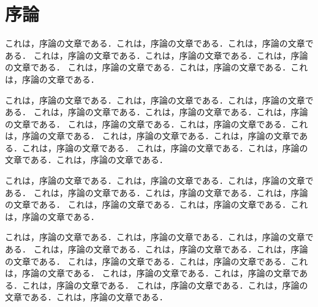 \chapter{序論}

これは，序論の文章である．これは，序論の文章である．これは，序論の文章である．
これは，序論の文章である．これは，序論の文章である．これは，序論の文章である．
これは，序論の文章である．これは，序論の文章である．これは，序論の文章である．

これは，序論の文章である．これは，序論の文章である．これは，序論の文章である．
これは，序論の文章である．これは，序論の文章である．これは，序論の文章である．
これは，序論の文章である．これは，序論の文章である．これは，序論の文章である．
これは，序論の文章である．これは，序論の文章である．これは，序論の文章である．
これは，序論の文章である．これは，序論の文章である．これは，序論の文章である．

これは，序論の文章である．これは，序論の文章である．これは，序論の文章である．
これは，序論の文章である．これは，序論の文章である．これは，序論の文章である．
これは，序論の文章である．これは，序論の文章である．これは，序論の文章である．

これは，序論の文章である．これは，序論の文章である．これは，序論の文章である．
これは，序論の文章である．これは，序論の文章である．これは，序論の文章である．
これは，序論の文章である．これは，序論の文章である．これは，序論の文章である．
これは，序論の文章である．これは，序論の文章である．これは，序論の文章である．
これは，序論の文章である．これは，序論の文章である．これは，序論の文章である．

